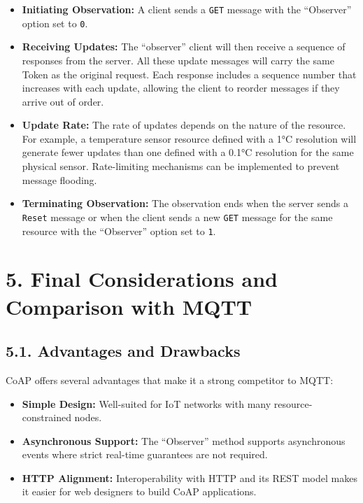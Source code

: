 \documentclass[a4paper, 12pt]{book} %
\begin{document}
\begin{itemize}
\tightlist
\item
  \textbf{Initiating Observation:} A client sends a \texttt{GET} message
  with the ``Observer'' option set to \texttt{0}.
\item
  \textbf{Receiving Updates:} The ``observer'' client will then receive
  a sequence of responses from the server. All these update messages
  will carry the same Token as the original request. Each response
  includes a sequence number that increases with each update, allowing
  the client to reorder messages if they arrive out of order.
\item
  \textbf{Update Rate:} The rate of updates depends on the nature of the
  resource. For example, a temperature sensor resource defined with a
  1°C resolution will generate fewer updates than one defined with a
  0.1°C resolution for the same physical sensor. Rate-limiting
  mechanisms can be implemented to prevent message flooding.
\item
  \textbf{Terminating Observation:} The observation ends when the server
  sends a \texttt{Reset} message or when the client sends a new
  \texttt{GET} message for the same resource with the ``Observer''
  option set to \texttt{1}.
\end{itemize}

\section{5. Final Considerations and Comparison with
MQTT}\label{final-considerations-and-comparison-with-mqtt}

\subsection{5.1. Advantages and
Drawbacks}\label{advantages-and-drawbacks}

CoAP offers several advantages that make it a strong competitor to MQTT:

\begin{itemize}
\tightlist
\item
  \textbf{Simple Design:} Well-suited for IoT networks with many
  resource-constrained nodes.
\item
  \textbf{Asynchronous Support:} The ``Observer'' method supports
  asynchronous events where strict real-time guarantees are not
  required.
\item
  \textbf{HTTP Alignment:} Interoperability with HTTP and its REST model
  makes it easier for web designers to build CoAP applications.
\end{itemize}
\end{document}
